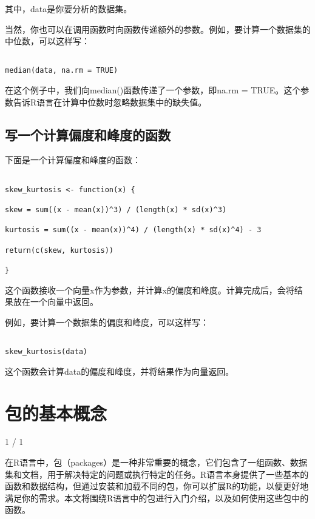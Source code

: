 \documentclass[
  letterpaper,
  DIV=11,
  numbers=noendperiod]{scrreprt}
\begin{document}
其中，data是你要分析的数据集。

当然，你也可以在调用函数时向函数传递额外的参数。例如，要计算一个数据集的中位数，可以这样写：

\begin{verbatim}

median(data, na.rm = TRUE)
\end{verbatim}

在这个例子中，我们向median()函数传递了一个参数，即na.rm =
TRUE。这个参数告诉R语言在计算中位数时忽略数据集中的缺失值。

\hypertarget{ux5199ux4e00ux4e2aux8ba1ux7b97ux504fux5ea6ux548cux5cf0ux5ea6ux7684ux51fdux6570}{%
\section{写一个计算偏度和峰度的函数}\label{ux5199ux4e00ux4e2aux8ba1ux7b97ux504fux5ea6ux548cux5cf0ux5ea6ux7684ux51fdux6570}}

下面是一个计算偏度和峰度的函数：

\begin{verbatim}

skew_kurtosis <- function(x) {

skew = sum((x - mean(x))^3) / (length(x) * sd(x)^3)

kurtosis = sum((x - mean(x))^4) / (length(x) * sd(x)^4) - 3

return(c(skew, kurtosis))

}
\end{verbatim}

这个函数接收一个向量x作为参数，并计算x的偏度和峰度。计算完成后，会将结果放在一个向量中返回。

例如，要计算一个数据集的偏度和峰度，可以这样写：

\begin{verbatim}

skew_kurtosis(data)
\end{verbatim}

这个函数会计算data的偏度和峰度，并将结果作为向量返回。

\hypertarget{ux5305ux7684ux57faux672cux6982ux5ff5}{%
\chapter{包的基本概念}\label{ux5305ux7684ux57faux672cux6982ux5ff5}}

1 / 1

在R语言中，包（packages）是一种非常重要的概念，它们包含了一组函数、数据集和文档，用于解决特定的问题或执行特定的任务。R语言本身提供了一些基本的函数和数据结构，但通过安装和加载不同的包，你可以扩展R的功能，以便更好地满足你的需求。本文将围绕R语言中的包进行入门介绍，以及如何使用这些包中的函数。
\end{document}
